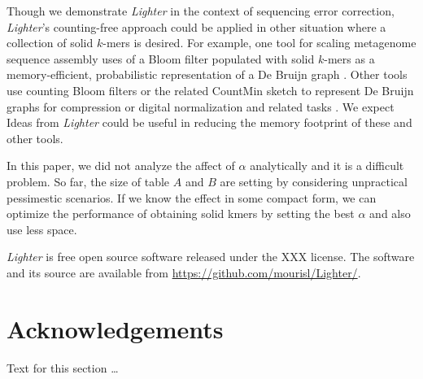 \documentclass[10pt]{article}
\begin{document}
Though we demonstrate \emph{Lighter} in the context of sequencing error correction, \emph{Lighter}'s counting-free approach could be applied in other situation where a collection of solid $k$-mers is desired.
For example, one tool for scaling metagenome sequence assembly uses of a Bloom filter populated with solid $k$-mers as a memory-efficient, probabilistic representation of a De Bruijn graph \cite{pell2012scaling}.
Other tools use counting Bloom filters \cite{fan2000summary, bonomi2006improved} or the related CountMin sketch \cite{cormode2005improved} to represent De Bruijn graphs for compression \cite{jones2012compression} or digital normalization and related tasks \cite{zhang2013these}.
We expect Ideas from \emph{Lighter} could be useful in reducing the memory footprint of these and other tools. 




In this paper, we did not analyze the affect of $\alpha$ analytically and it is a difficult problem. So far, the size of table $A$ and $B$ are setting by considering unpractical pessimestic scenarios. If we know the effect in some compact form, we can optimize the performance of obtaining solid kmers by setting the best $\alpha$ and also use less space.

\emph{Lighter} is free open source software released under the XXX license.  The software and its source are available from \url{https://github.com/mourisl/Lighter/}.

\section*{Acknowledgements}
  Text for this section \ldots



\end{document}
